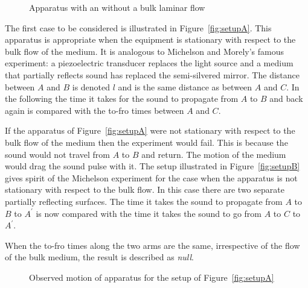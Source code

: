 \documentclass[10pt, fleqn,final,showtrims,oldfontcommands]{article} %
\newcommand{\figref}[1]{Figure~\ref{fig:#1}}
\begin{document}
 \begin{figure}[t]
      \centering
\hfill
\label{fig:setups}
      \caption{Apparatus with an without a bulk laminar flow}
 \end{figure}
The first case to be considered is illustrated in \figref{setupA}.
This apparatus is appropriate when the equipment is stationary with respect to the bulk flow of the medium.
It is  analogous to  Michelson and Morely's famous experiment:
a piezoelectric transducer  replaces the light source and a medium that partially reflects sound has replaced the semi-silvered mirror.
The distance between $A$ and $B$ is denoted $l$ and is the same distance as between $A$ and $C$.
In the following the time it takes for the sound to propagate from $A$ to $B$ and back again is compared with the to-fro times between $A$ and $C$.


If the apparatus of \figref{setupA} were not stationary with respect to the bulk flow of the medium then the experiment would fail.
This is because the sound would not travel from  $A$ to $B$ and return.
The motion of the medium would drag the sound pulse with it.
The setup illustrated in \figref{setupB} gives spirit of the Michelson experiment for the case when the apparatus is not stationary with respect to the bulk flow.
In this case there are two separate partially reflecting surfaces.
The time it takes the sound to propagate from $A$ to $B$ to $A^\prime$ is now compared with the time it takes the sound 
to go from $A$ to $C$ to $A^\prime$.

When the to-fro times along the two arms are the same, irrespective of the flow  of the bulk medium,  the result is described as {\em null}.

 \begin{figure}[t]
      \centering
\hfill
\label{fig:GalileanA}
      \caption{Observed motion of apparatus for the setup of \figref{setupA}}
 \end{figure}
\end{document}
